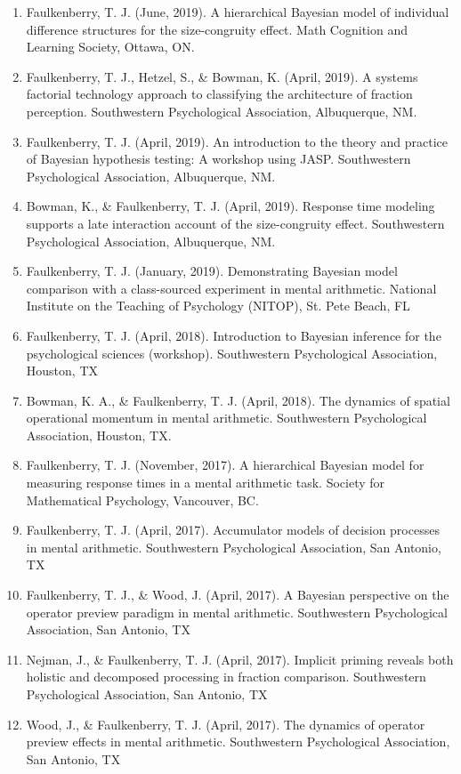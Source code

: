 \documentclass[article,10pt]{article}
\begin{document}
\begin{enumerate}
\item Faulkenberry, T. J. (June, 2019). A hierarchical Bayesian model of individual difference structures for the size-congruity effect. Math Cognition and Learning Society, Ottawa, ON.
\item Faulkenberry, T. J., Hetzel, S., \& Bowman, K. (April, 2019). A systems factorial technology approach to classifying the architecture of fraction perception. Southwestern Psychological Association, Albuquerque, NM.
\item Faulkenberry, T. J. (April, 2019). An introduction to the theory and practice of Bayesian hypothesis testing: A workshop using JASP. Southwestern Psychological Association, Albuquerque, NM.
\item Bowman, K., \& Faulkenberry, T. J. (April, 2019). Response time modeling supports a late interaction account of the size-congruity effect. Southwestern Psychological Association, Albuquerque, NM.
\item Faulkenberry, T. J. (January, 2019). Demonstrating Bayesian model comparison with a class-sourced experiment in mental arithmetic. National Institute on the Teaching of Psychology (NITOP), St. Pete Beach, FL
\item Faulkenberry, T. J. (April, 2018). Introduction to Bayesian inference for the psychological sciences (workshop). Southwestern Psychological Association, Houston, TX
\item Bowman, K. A., \& Faulkenberry, T. J. (April, 2018). The dynamics of spatial operational momentum in mental arithmetic. Southwestern Psychological Association, Houston, TX.
\item Faulkenberry, T. J. (November, 2017). A hierarchical Bayesian model for measuring response times in a mental arithmetic task. Society for Mathematical Psychology, Vancouver, BC.
\item Faulkenberry, T. J. (April, 2017). Accumulator models of decision processes in mental arithmetic. Southwestern Psychological Association, San Antonio, TX
\item Faulkenberry, T. J., \& Wood, J. (April, 2017). A Bayesian perspective on the operator preview paradigm in mental arithmetic. Southwestern Psychological Association, San Antonio, TX
\item Nejman, J., \& Faulkenberry, T. J. (April, 2017). Implicit priming reveals both holistic and decomposed processing in fraction comparison. Southwestern Psychological Association, San Antonio, TX
\item Wood, J., \& Faulkenberry, T. J. (April, 2017). The dynamics of operator preview effects in mental arithmetic. Southwestern Psychological Association, San Antonio, TX

\end{enumerate}
\end{document}
